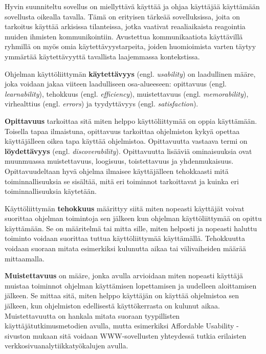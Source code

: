 \documentclass[utf8]{gradu3}
\begin{document}
Hyvin suunniteltu sovellus on miellyttävä käyttää ja ohjaa käyttäjää käyttämään sovellusta oikealla tavalla. Tämä on erityisen tärkeää sovelluksissa, joita on tarkoitus käyttää arkisissa tilanteissa, jotka vaativat reaaliaikaista reagointia muiden ihmisten kommunikointiin. Avustettua kommunikaatiota käyttävillä ryhmillä on myös omia käytettävyystarpeita, joiden huomioimista varten täytyy ymmärtää käytettävyyttä tavallista laajemmassa kontekstissa.

\label{general-usability-requirements}
Ohjelman käyttöliittymän \textbf{käytettävyys} (engl. \textit{usability}) on laadullinen määre, joka voidaan jakaa viiteen laadulliseen osa-alueeseen: opittavuus (engl. \textit{learnability}), tehokkuus (engl. \textit{efficiency}), muistettavuus (engl. \textit{memorability}), virhealttius (engl. \textit{errors}) ja tyydyttävyys (engl. \textit{satisfaction}). \parencite[]{usability-101}

\textbf{Opittavuus} tarkoittaa sitä miten helppo käyttöliittymää on oppia käyttämään. Toisella tapaa ilmaistuna, opittavuus tarkoittaa ohjelmiston kykyä opettaa käyttäjälleen oikea tapa käyttää ohjelmistoa. Opittavuutta vastaava termi on \textbf{löydettävyys} (engl. \textit{discoverability}). Opittavuutta lisääviä ominaisuuksia ovat muunmuassa muistettavuus, loogisuus, toistettavuus ja yhdenmukaisuus. Opittavuudeltaan hyvä ohjelma ilmaisee käyttäjälleen tehokkaasti mitä toiminnallisuuksia se sisältää, mitä eri toiminnot tarkoittavat ja kuinka eri toiminnallisuuksia käytetään. \parencite[]{improving-learnability}

Käyttöliittymän \textbf{tehokkuus} määrittyy siitä miten nopeasti käyttäjät voivat suorittaa ohjelman toimintoja sen jälkeen kun ohjelman käyttöliittymää on opittu käyttämään. Se on määritelmä tai mitta sille, miten helposti ja nopeasti haluttu toiminto voidaan suorittaa tuttua käyttöliittymää käyttämällä. Tehokkuutta voidaan suoraan mitata esimerkiksi kulunutta aikaa tai välivaiheiden määrää mittaamalla.

\textbf{Muistettavuus} on määre, jonka avulla arvioidaan miten nopeasti käyttäjä muistaa toiminnot ohjelman käyttämisen lopettamisen ja uudelleen aloittamisen jälkeen. Se mittaa sitä, miten helppo käyttäjän on käyttää ohjelmistoa sen jälkeen, kun ohjelmiston edellisestä käyttökerrasta on kulunut aikaa. Muistettavuutta on hankala mitata suoraan tyypillisten käyttäjätutkimusmetodien avulla, mutta esimerkiksi Affordable Usability -sivuston \parencite[]{affordable-usability} mukaan sitä voidaan WWW-sovellusten yhteydessä tutkia erilaisten verkkosivuanalytiikkatyökalujen avulla.
\end{document}
